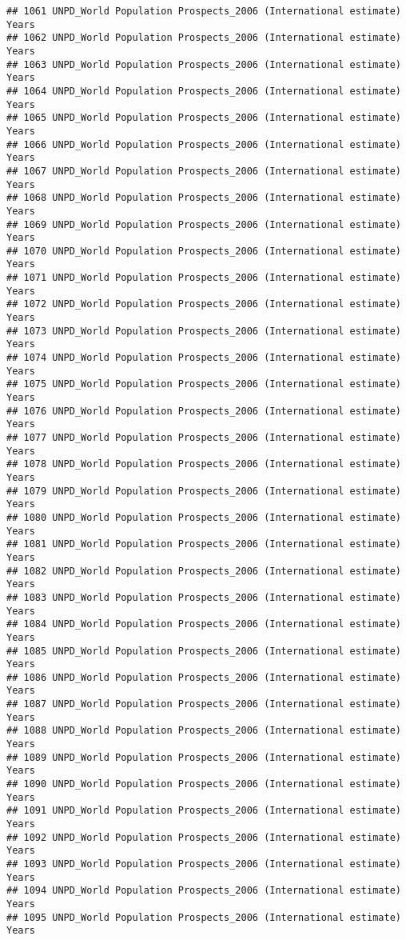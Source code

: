 \documentclass[]{article}
\begin{document}
\begin{verbatim}
## 1061 UNPD_World Population Prospects_2006 (International estimate) Years
## 1062 UNPD_World Population Prospects_2006 (International estimate) Years
## 1063 UNPD_World Population Prospects_2006 (International estimate) Years
## 1064 UNPD_World Population Prospects_2006 (International estimate) Years
## 1065 UNPD_World Population Prospects_2006 (International estimate) Years
## 1066 UNPD_World Population Prospects_2006 (International estimate) Years
## 1067 UNPD_World Population Prospects_2006 (International estimate) Years
## 1068 UNPD_World Population Prospects_2006 (International estimate) Years
## 1069 UNPD_World Population Prospects_2006 (International estimate) Years
## 1070 UNPD_World Population Prospects_2006 (International estimate) Years
## 1071 UNPD_World Population Prospects_2006 (International estimate) Years
## 1072 UNPD_World Population Prospects_2006 (International estimate) Years
## 1073 UNPD_World Population Prospects_2006 (International estimate) Years
## 1074 UNPD_World Population Prospects_2006 (International estimate) Years
## 1075 UNPD_World Population Prospects_2006 (International estimate) Years
## 1076 UNPD_World Population Prospects_2006 (International estimate) Years
## 1077 UNPD_World Population Prospects_2006 (International estimate) Years
## 1078 UNPD_World Population Prospects_2006 (International estimate) Years
## 1079 UNPD_World Population Prospects_2006 (International estimate) Years
## 1080 UNPD_World Population Prospects_2006 (International estimate) Years
## 1081 UNPD_World Population Prospects_2006 (International estimate) Years
## 1082 UNPD_World Population Prospects_2006 (International estimate) Years
## 1083 UNPD_World Population Prospects_2006 (International estimate) Years
## 1084 UNPD_World Population Prospects_2006 (International estimate) Years
## 1085 UNPD_World Population Prospects_2006 (International estimate) Years
## 1086 UNPD_World Population Prospects_2006 (International estimate) Years
## 1087 UNPD_World Population Prospects_2006 (International estimate) Years
## 1088 UNPD_World Population Prospects_2006 (International estimate) Years
## 1089 UNPD_World Population Prospects_2006 (International estimate) Years
## 1090 UNPD_World Population Prospects_2006 (International estimate) Years
## 1091 UNPD_World Population Prospects_2006 (International estimate) Years
## 1092 UNPD_World Population Prospects_2006 (International estimate) Years
## 1093 UNPD_World Population Prospects_2006 (International estimate) Years
## 1094 UNPD_World Population Prospects_2006 (International estimate) Years
## 1095 UNPD_World Population Prospects_2006 (International estimate) Years

\end{verbatim}
\end{document}

